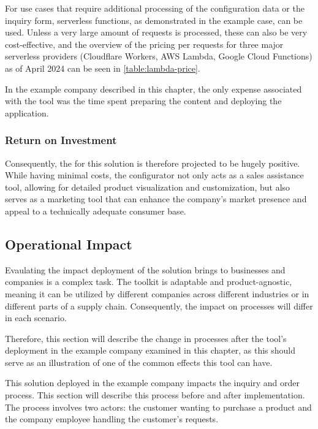 For use cases that require additional processing of the configuration data or the inquiry form, serverless functions, as demonstrated in the example case, can be used. Unless a very large amount of requests is processed, these can also be very cost-effective, and the overview of the pricing per requests for three major serverless providers (Cloudflare Workers, AWS Lambda, Google Cloud Functions) as of April 2024 can be seen in \autoref{table:lambda-price}.


In the example company described in this chapter, the only expense associated with the tool was the time spent preparing the content and deploying the application.


\subsubsection{Return on Investment}

Consequently, the  for this solution is therefore projected to be hugely positive. While having minimal costs, the configurator not only acts as a sales assistance tool, allowing for detailed product visualization and customization, but also serves as a marketing tool that can enhance the company's market presence and appeal to a technically adequate consumer base. 


\subsection{Operational Impact}

Evaulating the impact deployment of the solution brings to businesses and companies is a complex task. The toolkit is adaptable and product-agnostic, meaning it can be utilized by different companies across different industries or in different parts of a supply chain. Consequently, the impact on processes will differ in each scenario.

Therefore, this section will describe the change in processes after the tool's deployment in the example company examined in this chapter, as this should serve as an illustration of one of the common effects this tool can have.

This solution deployed in the example company impacts the inquiry and order process. This section will describe this process before and after implementation. The process involves two actors: the customer wanting to purchase a product and the company employee handling the customer's requests.

